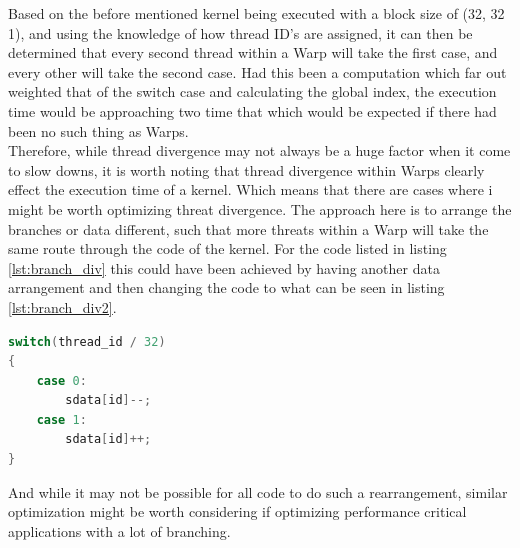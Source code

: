 Based on the before mentioned kernel being executed with a block size of (32, 32 1), and using the knowledge of how thread ID's are assigned, it can then be determined that every second thread within a Warp will take the first case, and every other will take the second case. Had this been a computation which far out weighted that of the switch case and calculating the global index, the execution time would be approaching two time that which would be expected if there had been no such thing as Warps.\\

Therefore, while thread divergence may not always be a huge factor when it come to slow downs, it is worth noting that thread divergence within Warps clearly effect the execution time of a kernel. Which means that there are cases where i might be worth optimizing threat divergence. The approach here is to arrange the branches or data different, such that more threats within a Warp will take the same route through the code of the kernel. For the code listed in listing \ref{lst:branch_div} this could have been achieved by having another data arrangement and then changing the code to what can be seen in listing \ref{lst:branch_div2}.

\begin{lstlisting}[language=C,caption={Creating a better arrangement of threads to allign with warps},label=lst:branch_div2]
switch(thread_id / 32)
{
	case 0:
		sdata[id]--;
	case 1:
		sdata[id]++;
}
\end{lstlisting} 

And while it may not be possible for all code to do such a rearrangement, similar optimization might be worth considering if optimizing performance critical applications with a lot of branching.